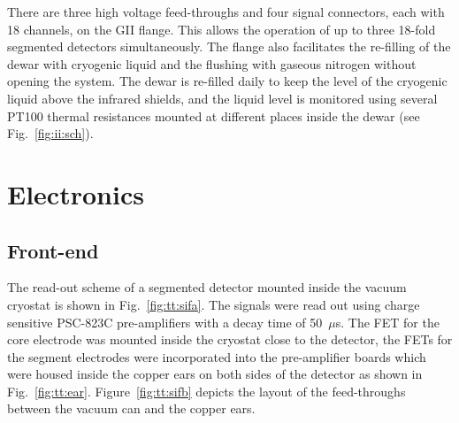 There are three high voltage feed-throughs and four signal connectors, each with 18 channels, on the GII flange. This allows the operation of up to three 18-fold segmented detectors simultaneously. The flange also facilitates the re-filling of the dewar with cryogenic liquid and the flushing with gaseous nitrogen without opening the system. The dewar is re-filled daily to keep the level of the cryogenic liquid above the infrared shields, and the liquid level is monitored using several PT100 thermal resistances mounted at different places inside the dewar (see Fig.~\ref{fig:ii:sch}).


\section{Electronics} 
\label{sec:tt:ele} 

\subsection{Front-end}
\label{sec:tt:fend} 
The read-out scheme of a segmented detector mounted inside the vacuum cryostat is shown in Fig.~\ref{fig:tt:sifa}. The signals were read out using charge sensitive PSC-823C pre-amplifiers with a decay time of 50~$\mu$s. The FET for the core electrode was mounted inside the cryostat close to the detector, the FETs for the segment electrodes were incorporated into the pre-amplifier boards which were housed inside the copper ears on both sides of the detector as shown in Fig.~\ref{fig:tt:ear}. Figure~\ref{fig:tt:sifb} depicts the layout of the feed-throughs between the vacuum can and the copper ears.

